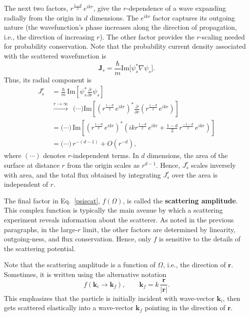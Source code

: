 \documentclass[pra,12pt]{revtex4-2}
\begin{document}
The next two factors, $r^{\frac{1-d}{2}} \, e^{ikr}$, give the
$r$-dependence of a wave expanding radially from the origin in $d$
dimensions.  The $e^{ikr}$ factor captures its outgoing nature (the
wavefunction's phase increases along the direction of propagation,
i.e., the direction of increasing $r$).  The other factor provides the
$r$-scaling needed for probability conservation.  Note that the
probability current density associated with the scattered wavefunction
is
\begin{equation}
  \mathbf{J}_s = \frac{\hbar}{m} \mathrm{Im}\big[\psi_s^*\nabla\psi_s\big].
\end{equation}
Thus, its radial component is
\begin{equation}
  \begin{aligned}J_{s}^r\; &= \frac{\hbar}{m}\, \mathrm{Im}\left[\psi_s^* \frac{\partial}{\partial r}\psi_s\right] \\
    &\overset{r\rightarrow\infty}{\longrightarrow}\;\, \big(\cdots\big)
    \mathrm{Im}\left[\left(r^{\frac{1-d}{2}} \, e^{ikr}\right)^* \frac{\partial}{\partial r} \left(r^{\frac{1-d}{2}} \, e^{ikr}\right)\right] \\
    &= \big(\cdots\big)\,
    \mathrm{Im}\left[\left(r^{\frac{1-d}{2}} \, e^{ikr}\right)^* \left(ik r^{\frac{1-d}{2}} \, e^{ikr} + \frac{1-d}{2} \, r^{\frac{-1-d}{2}} \, e^{ikr}\right)\right] \\
    &= \big(\cdots\big) \, r^{-(d-1)} + O(r^{-d}),
  \end{aligned}
  \label{Jsrcalc}
\end{equation}
where $(\cdots)$ denotes $r$-independent terms.  In $d$ dimensions,
the area of the surface at distance $r$ from the origin scales as
$r^{d-1}$.  Hence, $J_{s}^r$ scales inversely with area, and the total
flux obtained by integrating $J_{s}^r$ over the area is independent of
$r$.

The final factor in Eq.~\eqref{psiscat}, $f(\Omega)$, is called the
\textbf{scattering amplitude}.  This complex function is typically the
main avenue by which a scattering experiment reveals information about
the scatterer.  As noted in the previous paragraphs, in the large-$r$
limit, the other factors are determined by linearity, outgoing-ness,
and flux conservation.  Hence, only $f$ is sensitive to the details of
the scattering potential.

Note that the scattering amplitude is a function of $\Omega$, i.e.,
the direction of $\mathbf{r}$.  Sometimes, it is written using the
alternative notation
\begin{equation}
  f(\mathbf{k}_i \rightarrow \mathbf{k}_f), \qquad
  \mathbf{k}_f = k\, \frac{\mathbf{r}}{|\mathbf{r}|}.
\end{equation}
This emphasizes that the particle is initially incident with
wave-vector $\mathbf{k}_i$, then gets scattered elastically into a
wave-vector $\mathbf{k}_f$ pointing in the direction of $\mathbf{r}$.
\end{document}
